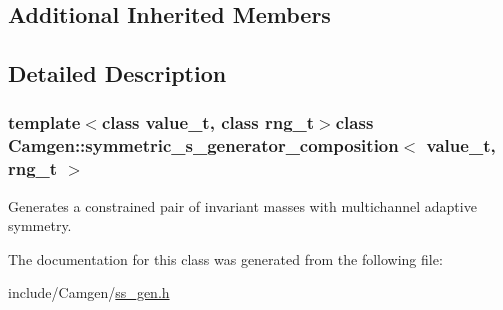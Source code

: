 \subsection*{Additional Inherited Members}


\subsection{Detailed Description}
\subsubsection*{template$<$class value\+\_\+t, class rng\+\_\+t$>$class Camgen\+::symmetric\+\_\+s\+\_\+generator\+\_\+composition$<$ value\+\_\+t, rng\+\_\+t $>$}

Generates a constrained pair of invariant masses with multichannel adaptive symmetry. 



The documentation for this class was generated from the following file\+:\begin{DoxyCompactItemize}
\item 
include/\+Camgen/\hyperlink{a00785}{ss\+\_\+gen.\+h}\end{DoxyCompactItemize}
